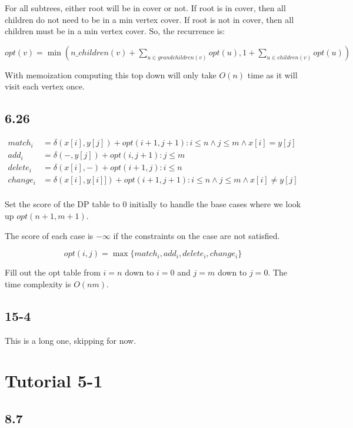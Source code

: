 \documentclass[11pt]{article}
\begin{document}
For all subtrees, either root will be in cover or not. If root is in cover, then all children do not need to be in a min vertex cover. If root is not in cover, then all children must be in a min vertex cover. So, the recurrence is:

$opt(v) = \min( n\_children(v) + \sum_{u \in grandchildren(v)} opt(u), 1 + \sum_{u \in children(v)} opt(u))$

With memoization computing this top down will only take $O(n)$ time as it will visit each vertex once.

\subsection{6.26}
\begin{align*}
    match_i  & = \delta(x[i], y[j]) + opt(i + 1, j + 1) :  i \leq n \wedge j \leq m \wedge x[i] = y[j]    \\
    add_i    & = \delta(-, y[j]) + opt(i, j + 1) : j \leq m                                               \\
    delete_i & = \delta(x[i], -) + opt(i + 1, j) : i \leq n                                               \\
    change_i & = \delta(x[i], y[i]]) + opt(i + 1, j + 1) : i \leq n \wedge j \leq m \wedge x[i] \neq y[j] \\
\end{align*}

Set the score of the DP table to $0$ initially to handle the base cases where we look up $opt(n + 1, m + 1)$.

The score of each case is $- \infty$ if the constraints on the case are not satisfied.

\[ opt(i, j) = \max \{ match_i, add_i, delete_i, change_i \} \]

Fill out the opt table from $i = n$ down to $i = 0$ and $j = m$ down to $j = 0$. The time complexity is $O(nm)$.

\subsection{15-4}

This is a long one, skipping for now.

\section{Tutorial 5-1}

\subsection{8.7}
\end{document}
